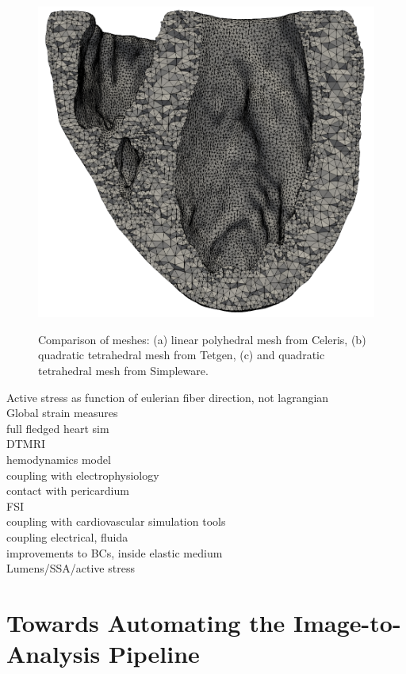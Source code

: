 \begin{figure}
{		\includegraphics[scale=0.3]{media/3-celeris/10-simpleware.png}
\label{fig:comp-3}}			
	
%
\caption{Comparison of meshes: (a) linear polyhedral mesh from Celeris, (b) quadratic tetrahedral mesh from Tetgen, (c) and quadratic tetrahedral mesh from Simpleware.}
\label{fig:comp}
\end{figure}


Active stress as function of eulerian fiber direction, not lagrangian \\
Global strain measures \\
full fledged heart sim \\
DTMRI \\
hemodynamics model \\
coupling with electrophysiology \\
contact with pericardium \\
FSI \\
coupling with cardiovascular simulation tools \\
coupling electrical, fluida \\
improvements to BCs, inside elastic medium \\
Lumens/SSA/active stress \\

\section{Towards Automating the Image-to-Analysis Pipeline}
\label{Towards Automating the Image-to-Analysis Pipeline}
